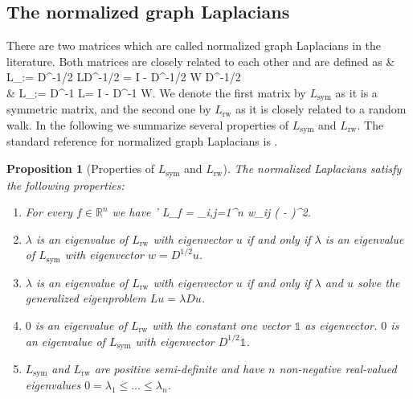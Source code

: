 \documentclass{article}
\def\ba#1\ea{\begin{align*}#1\end{align*}} %
\newtheorem{proposition}[lemma]{Proposition}
\newcommand{\RR}{\mathbb{R}}
\newcommand{\R}{\RR}
\newcommand{\charfct}{\mathbb{1}}
\newcommand{\Lun}{L}
\newcommand{\Lsym}{L_{\text{sym}}}
\newcommand{\Lrw}{L_{\text{rw}}}
\begin{document}
%
\subsection{The normalized graph Laplacians} \label{ssec-lnorm}
%



There are two matrices which are called normalized graph
Laplacians in the literature. Both matrices are closely related to
each other and are defined as 
%
\ba
& \Lsym := D^{-1/2} \Lun D^{-1/2} = I -  D^{-1/2} W D^{-1/2}\\
& \Lrw := D^{-1} \Lun = I - D^{-1} W. 
\ea 
%
We denote the first matrix by $\Lsym$ as it is a symmetric matrix, and
the second one by $\Lrw$ as it is closely related to a random walk.
In the following we summarize several properties of $\Lsym$ and
$\Lrw$. The standard reference for normalized graph Laplacians is . \\



%
%
\begin{proposition}[Properties of $\Lsym$ and $\Lrw$] 
\label{prop-norm}
%
The normalized Laplacians satisfy the following properties:
\begin{enumerate}

\item For every $f \in \R^n$ we have 
\ba
f' \Lsym f = 
 \sum_{i,j=1}^n w_{ij} 
\left( - \right)^2.
\ea

\item $\lambda$ is an eigenvalue of $\Lrw$ with eigenvector $u$ if
  and only if $\lambda$ is an eigenvalue of $\Lsym$ with eigenvector
  $w = D^{1/2} u$. 

\item $\lambda$ is an eigenvalue of $\Lrw$ with eigenvector $u$ if and
  only if $\lambda$ and $u$ solve the generalized eigenproblem
  $\Lun u = \lambda D u$. 

\item $0$ is an eigenvalue of $\Lrw$ with the constant one vector
  $\charfct$ as eigenvector. $0$ is an eigenvalue of $\Lsym$ with
  eigenvector $D^{1/2}\charfct$. 

\item $\Lsym$ and $\Lrw$ are positive semi-definite and have $n$
  non-negative   real-valued eigenvalues  $0 = \lambda_1 \leq \hdots
  \leq \lambda_n$. 

\end{enumerate}
\end{proposition}
%
%
\end{document}
